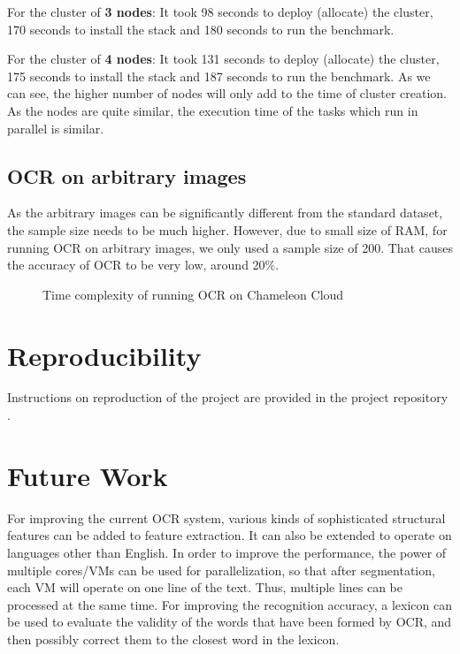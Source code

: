 \documentclass[9pt,twocolumn,twoside]{../../styles/osajnl}
\begin{document}
For the cluster of \textbf{3 nodes}:
It took 98 seconds to deploy (allocate) the cluster, 170 seconds to install the stack and
180 seconds to run the benchmark.

For the cluster of \textbf{4 nodes}:
It took 131 seconds to deploy (allocate) the cluster, 175 seconds to install the stack and
187 seconds to run the benchmark.
As we can see, the higher number of nodes will only add to the time of cluster creation. As the nodes are
quite similar, the execution time of the tasks which run in parallel is similar.

\subsection{OCR on arbitrary images}
As the arbitrary images can be significantly different from 
the standard dataset, the sample size needs to be much higher. However, due to small size of RAM, for running OCR on arbitrary images, we only used a sample size of 200. That causes the accuracy of OCR to be very low, around 20\%.


\begin{figure}[H]
\centering
{}
\caption{Time complexity of running OCR on Chameleon Cloud}
\end{figure}

\section{Reproducibility}
Instructions on reproduction of the project are provided in the project 
repository \cite{git-self-code}.


\section{Future Work}
For improving the current OCR system, various kinds of sophisticated structural features
can be added to feature extraction. It can also be extended to operate on languages other
than English. In order to improve the performance, the power of multiple cores/VMs can be
used for parallelization, so that after segmentation, each VM will operate on one line
of the text. Thus, multiple lines can be processed at the same time. For improving the
recognition accuracy, a lexicon can be used to evaluate the validity of the words that
have been formed by OCR, and then possibly correct them to the closest word in the lexicon.
\end{document}

